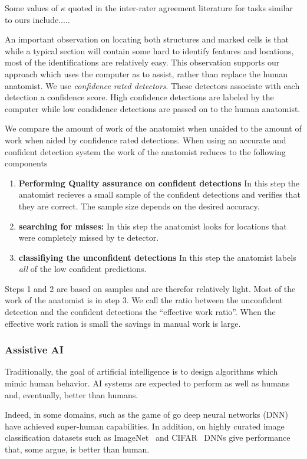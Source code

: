 \documentclass[11pt]{article}
\begin{document}
Some values of $\kappa$ quoted in the inter-rater agreement literature
for tasks similar to ours include.....





  An important observation on locating both structures and marked cells
is that while a typical section will contain some hard to identify
features and locations, most of the identifications are relatively
easy. This observation supports our approach which uses the computer as
to assist, rather than replace the human anatomist. We
use {\em confidence rated detectors}. These detectors
associate with each detection a confidence score. High confidence
detections are labeled by the computer while low condidence detections
are passed on to the human anatomist.

We compare the amount of work of the anatomist when unaided to the
amount of work when aided by confidence rated detections.
When using an accurate and confident detection system the work of the
anatomist reduces to the following components
\begin{enumerate}
\item {\bf Performing Quality assurance on confident detections} In this step the
  anatomist recieves a small sample of the confident detections and
  verifies that they are correct. The sample size depends on the
  desired accuracy.
\item {\bf searching for misses:} In this step the anatomist looks
  for locations that were completely missed by te detector.
\item {\bf classifiying the unconfident detections} In this step
  the anatomist labels {\em all} of the low confident predictions.
  \end{enumerate}
Steps 1 and 2 are based on samples and are therefor relatively light.
Most of the work of the anatomist is in step 3. We call the ratio
between the unconfident detection and the confident detections the 
``effective work ratio''. When the effective work ration is small the
savings in manual work is large.
  
\subsubsection{Assistive AI} Traditionally, the goal of artificial
  intelligence is to design algorithms which mimic human behavior. AI
  systems are expected to perform as well as humans and, eventually,
  better than humans.

Indeed, in some domains, such as the game of go \cite{silver2017mastering} deep neural
networks (DNN)  have achieved super-human capabilities. In addition,
on highly curated image classification datasets such as ImageNet~\cite{deng2009imagenet} and
CIFAR~\cite{krizhevsky2009learning} DNNs give performance that, some argue, is better than
human. 
\end{document}
